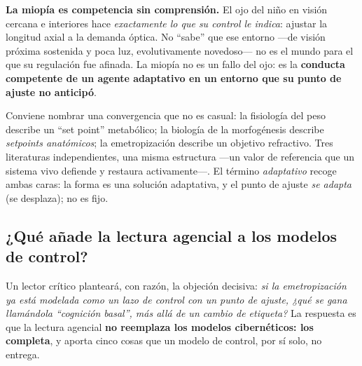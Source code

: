 \documentclass[11pt,a4paper]{article}
\begin{document}
\textbf{La miopía es competencia sin comprensión.} El ojo del niño en visión cercana e interiores hace \emph{exactamente lo que su control le indica}: ajustar la longitud axial a la demanda óptica. No \enquote{sabe} que ese entorno ---de visión próxima sostenida y poca luz, evolutivamente novedoso--- no es el mundo para el que su regulación fue afinada. La miopía no es un fallo del ojo: es la \textbf{conducta competente de un agente adaptativo en un entorno que su punto de ajuste no anticipó}.

Conviene nombrar una convergencia que no es casual: la fisiología del peso describe un \enquote{set point} metabólico; la biología de la morfogénesis describe \emph{setpoints anatómicos}; la emetropización describe un objetivo refractivo. Tres literaturas independientes, una misma estructura ---un valor de referencia que un sistema vivo defiende y restaura activamente---. El término \emph{adaptativo} recoge ambas caras: la forma es una solución adaptativa, y el punto de ajuste \emph{se adapta} (se desplaza); no es fijo.

\subsection{¿Qué añade la lectura agencial a los modelos de control?}

Un lector crítico planteará, con razón, la objeción decisiva: \emph{si la emetropización ya está modelada como un lazo de control con un punto de ajuste, ¿qué se gana llamándola \enquote{cognición basal}, más allá de un cambio de etiqueta?} La respuesta es que la lectura agencial \textbf{no reemplaza los modelos cibernéticos: los completa}, y aporta cinco cosas que un modelo de control, por sí solo, no entrega.
\end{document}
